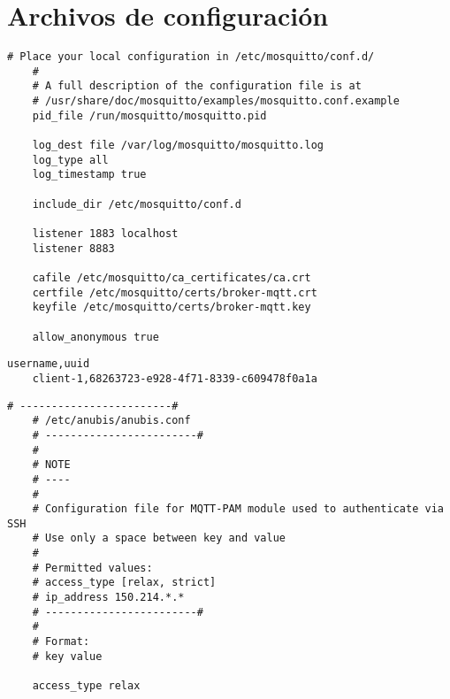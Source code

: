 \addappheadtotoc

\appendix

\chapter{Archivos de configuración}

\begin{lstlisting}[style=Consola, caption={Archivo de configuración PAM}, label={code:pam_conf}]
    # Place your local configuration in /etc/mosquitto/conf.d/
    #
    # A full description of the configuration file is at
    # /usr/share/doc/mosquitto/examples/mosquitto.conf.example
    pid_file /run/mosquitto/mosquitto.pid

    log_dest file /var/log/mosquitto/mosquitto.log
    log_type all
    log_timestamp true

    include_dir /etc/mosquitto/conf.d

    listener 1883 localhost
    listener 8883

    cafile /etc/mosquitto/ca_certificates/ca.crt
    certfile /etc/mosquitto/certs/broker-mqtt.crt
    keyfile /etc/mosquitto/certs/broker-mqtt.key

    allow_anonymous true
\end{lstlisting}

\begin{lstlisting}[style=Consola, caption={Archivo de configuración de usuarios en /etc/anubis/uuid.csv}, label={code:user_conf}]
    username,uuid
    client-1,68263723-e928-4f71-8339-c609478f0a1a   
\end{lstlisting}

\clearpage

\begin{lstlisting}[style=Consola, caption={Archivo de configuración anubis en /etc/anubis/anubis.conf}, label={code:anubis_conf}]
    # ------------------------#
    # /etc/anubis/anubis.conf
    # ------------------------#
    #
    # NOTE
    # ----
    #
    # Configuration file for MQTT-PAM module used to authenticate via SSH
    # Use only a space between key and value
    #
    # Permitted values:
    # access_type [relax, strict]
    # ip_address 150.214.*.*
    # ------------------------#
    #
    # Format:
    # key value

    access_type relax   
\end{lstlisting}


